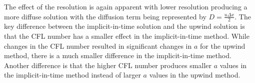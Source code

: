 The effect of the resolution is again apparent with lower resolution producing a more diffuse solution with the diffusion term being represented by $D = \frac{u\Delta x}{2}$. The key difference between the implicit-in-time solution and the upwind solution is that the CFL number has a smaller effect in the implicit-in-time method. While changes in the CFL number resulted in significant changes in $a$ for the upwind method, there is a much smaller difference in the implicit-in-time method. Another difference is that the higher CFL number produces smaller $a$ values in the implicit-in-time method instead of larger $a$ values in the upwind method.